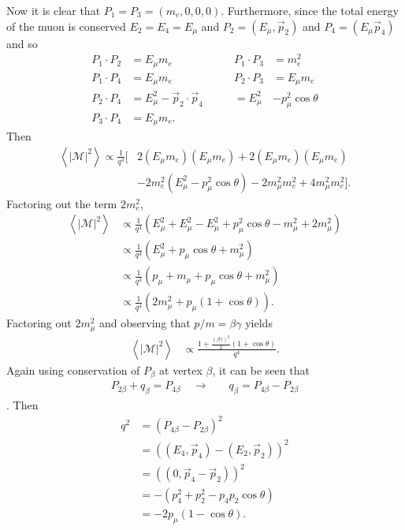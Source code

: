 Now it is clear that $P_1=P_3=(m_e, 0, 0, 0)$. Furthermore, since the total energy of the muon is conserved $E_2 = E_4 = E_\mu$ and $P_2 = (E_\mu, \vec{p}_2)$ and $P_4 = (E_\mu \vec{p}_4)$ and so
\begin{align*}
P_1 \cdot P_2 &= E_\mu m_e &\qquad P_1 \cdot P_3 &= m_e ^2 \\
P_1 \cdot P_4 &= E_\mu m_e &\qquad  P_2 \cdot P_3 &= E_\mu m_e \\
P_2 \cdot P_4 &= E_\mu ^2 - \vec{p}_2 \cdot \vec{p}_4 &\qquad = E_\mu ^2  & - p_\mu ^2 \cos\theta\\
P_3 \cdot P_4 &= E_\mu m_e.
\end{align*}
Then
\begin{align*}
\left< |\mathcal{M}|^2\right> \propto \frac{1}{q^4} [&2 (E_\mu m_e)(E_\mu m_e) + 2 (E_\mu m_e) (E_\mu m_e) \\
&- 2 m_e ^2 (E_\mu^2 - p_\mu ^2 \cos\theta) - 2 m_\mu ^2 m_e ^2 + 4 m_\mu ^2 m_e ^2].
\end{align*}
Factoring out the term $2m_e ^2$, 
\begin{align*}
\left< |\mathcal{M}|^2\right> 
&\propto \frac{1}{q^4} (E_\mu ^2 + E_\mu ^2 - E_\mu ^2 + p_\mu ^2 \cos\theta - m_\mu ^2+ 2 m_\mu ^2 ) \\
&\propto \frac{1}{q^4} (E_\mu ^2 + p_\mu \cos\theta + m_\mu^2)\\
&\propto \frac{1}{q^4} (p_\mu + m_\mu + p_\mu \cos\theta + m_\mu^2)\\
&\propto \frac{1}{q^4} (2 m_\mu ^2 + p_\mu (1+\cos\theta)).
\end{align*}
Factoring out $2m_\mu ^2$ and observing that $p/m = \beta\gamma$ yields
\begin{align*}
\left< |\mathcal{M}|^2\right> 
&\propto \frac{1+\frac{(\beta\gamma)^2}{2} (1+\cos\theta)  }{q^4}.
\end{align*}
Again using conservation of $P_\beta$ at vertex $\beta$, it can be seen that 
\begin{align*}
P_{2\beta}+q_\beta=P_{4\beta} \quad \rightarrow \quad & q_\beta = P_{4\beta} - P_{2\beta}
\end{align*}.
Then
\begin{align*}
q^2 &= ( P_{4\beta} - P_{2\beta}) ^2\\
&= ( (E_4, \vec{p}_4) - (E_2, \vec{p}_2 ) )^2\\
& = ((0, \vec{p}_4 - \vec{p}_2))^2\\
& = - (p_4 ^2 + p_2 ^2 - p_4 p_2 \cos\theta)\\
&=-2p_\mu (1-\cos\theta).
\end{align*}
